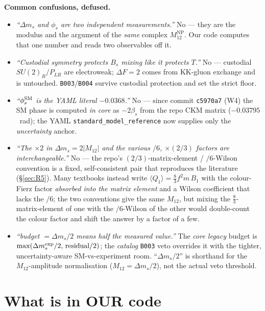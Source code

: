 \documentclass[11pt]{article}
\newenvironment{callout}[1]{%
  \par\medskip\begin{shaded}\noindent\textbf{#1}\par\smallskip}{\end{shaded}\medskip}
\newcommand{\SUR}{SU(2)_R}
\newcommand{\PLR}{P_{LR}}
\newcommand{\code}[1]{\texttt{#1}}
\newcommand{\Bs}{B_s}
\newcommand{\dms}{\Delta m_s}
\newcommand{\phis}{\phi_s}
\newcommand{\Mtwelve}{M_{12}}
\newcommand{\MtwelveNP}{M_{12}^{\mathrm{NP}}}
\newcommand{\betas}{\beta_s}
\theoremstyle{definition}
\begin{document}
\begin{callout}{Common confusions, defused.}
\begin{itemize}[leftmargin=1.2em,nosep]
\item[\textbf{A.}] \emph{``$\dms$ and $\phis$ are two independent measurements.''}
No --- they are the modulus and the argument of the \emph{same} complex
$\MtwelveNP$. Our code computes that one number and reads two observables off it.
\item[\textbf{B.}] \emph{``Custodial symmetry protects $\Bs$ mixing like it
protects $T$.''} No --- custodial $\SUR/\PLR$ are electroweak; $\Delta F=2$ comes
from KK-gluon exchange and is untouched. \code{B003}/\code{B004} survive
custodial protection and set the strict floor.
\item[\textbf{C.}] \emph{``$\phis^{\rm SM}$ is the YAML literal $-0.0368$.''}
No --- since commit \code{c5970a7} (W4) the SM phase is computed \emph{in core}
as $-2\betas$ from the repo CKM matrix ($-0.03795$~rad); the YAML
\code{standard\_model\_reference} now supplies only the \emph{uncertainty} anchor.
\item[\textbf{D.}] \emph{``The $\times 2$ in $\dms=2|\Mtwelve|$ and the various
$/6$, $\times(2/3)$ factors are interchangeable.''} No --- the repo's
$(2/3)$-matrix-element / $/6$-Wilson convention is a fixed, self-consistent
pair that reproduces the literature (\S\ref{sec:R5}). Many textbooks instead
write $\langle Q_1\rangle = \tfrac83 f^2 m\, B_1$ with the colour-Fierz factor
\emph{absorbed into the matrix element} and a Wilson coefficient that lacks the
$/6$; the two conventions give the same $\Mtwelve$, but mixing the
$\tfrac83$-matrix-element of one with the $/6$-Wilson of the other would
double-count the colour factor and shift the answer by a factor of a few.
\item[\textbf{E.}] \emph{``budget $=\dms/2$ means half the measured value.''}
The \emph{core legacy} budget is $\max(\dms^{\rm exp}/2,\,\text{residual}/2)$; the
\emph{catalog} \code{B003} veto overrides it with the tighter, uncertainty-aware
SM-vs-experiment room. ``$\dms/2$'' is shorthand for the $M_{12}$-amplitude
normalisation ($\Mtwelve=\dms/2$), not the actual veto threshold.
\end{itemize}
\end{callout}

\part{What is in OUR code}
\label{part:code}
\end{document}
